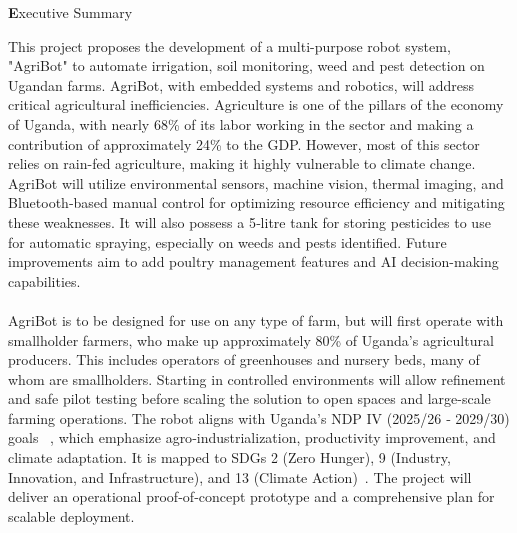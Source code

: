 \documentclass[12pt,a4paper]{report}
\begin{document}
\begin{center}
    {\LARGE\textbf Executive Summary}
\end{center}
\noindent
This project proposes the development of a multi-purpose robot system, "AgriBot"
to automate irrigation, soil monitoring, weed and pest detection
on Ugandan farms. AgriBot, with embedded systems and robotics, will
address critical agricultural inefficiencies. Agriculture is one of the pillars of the economy of Uganda, with nearly 68\% of its labor working in the sector and
making a contribution of approximately 24\% to the GDP. However, most of this sector relies on rain-fed agriculture,
making it highly vulnerable to climate change. AgriBot will utilize environmental
sensors, machine vision, thermal imaging, and Bluetooth‐based manual control for optimizing resource efficiency and mitigating these weaknesses. It will also possess a 5‐litre tank for storing pesticides to use for automatic spraying, especially on weeds and pests identified.
Future improvements aim to add poultry management features and AI decision-making capabilities.\\\\
\noindent
AgriBot is to be designed for use on any type of farm, but will first operate
with smallholder farmers, who make up approximately 80\% of Uganda's agricultural producers. This includes operators of greenhouses and nursery beds, many of whom are smallholders. Starting in controlled environments will allow refinement and safe pilot testing before scaling the solution to open spaces and large-scale farming operations.
The robot aligns with Uganda's NDP IV (2025/26 ‐ 2029/30) goals ~\cite{uganda2024ndpiv}, which emphasize agro‐industrialization, productivity improvement, and climate adaptation.
It is mapped to SDGs 2 (Zero Hunger), 9 (Industry, Innovation, and Infrastructure), and 13
(Climate Action)~\cite{colglazier2015sustainable}. The project will deliver an operational proof‐of‐concept prototype and a comprehensive plan for scalable deployment. 


\setcounter{tocdepth}{3}


\tableofcontents
\clearpage
\end{document}
